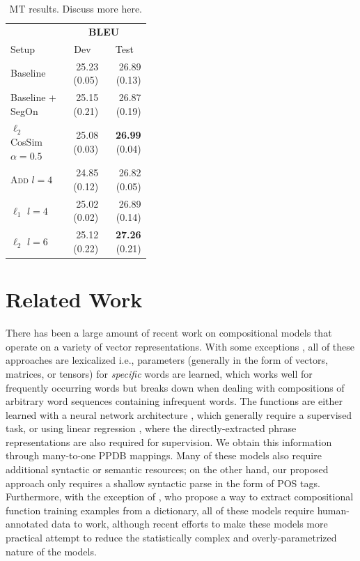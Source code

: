 \documentclass[11pt,letterpaper]{article}
\begin{document}
\begin{table}[h!]
  \begin{center}
    \begin{tabular}{p{0.4\linewidth}rr}
      \hline
	  & \multicolumn{2}{c}{\bf BLEU} \\
      Setup &  \multicolumn{1}{c}{Dev} & \multicolumn{1}{c}{Test} \\
	  \hline
	  Baseline & 25.23 (0.05) & 26.89 (0.13) \\
      Baseline + SegOn & 25.15 (0.21) & 26.87 (0.19) \\
	  $\ell_2$ CosSim $\alpha=0.5$ &  25.08 (0.03) & {\bf26.99} (0.04) \\
  	  \textsc{Add} $l=4$ &  24.85 (0.12) & 26.82 (0.05) \\
      $\ell_1$ $l=4$ &  25.02 (0.02) & 26.89 (0.14) \\
	  $\ell_2$  $l=6$ & 25.12 (0.22) & {\bf 27.26} (0.21) \\
	\end{tabular}
  \end{center}
  \caption{MT results. Discuss more here.}
  \label{tab:mt-results}
\end{table}

\section{Related Work}

There has been a large amount of recent work on compositional models that operate on a variety of vector representations. 
With some exceptions \cite{Mitchell2008,Mitchell2010}, all of these approaches are lexicalized i.e., parameters (generally in the form of vectors, matrices, or tensors) for \emph{specific} words are learned, which works well for frequently occurring words but breaks down when dealing with compositions of arbitrary word sequences containing infrequent words. 
The functions are either learned with a neural network architecture \cite[\emph{inter alia}]{Socher2013}, which generally require a supervised task, or using linear regression \cite{Baroni2010,Zanzotto2010}, where the directly-extracted phrase representations are also required for supervision.
We obtain this information through many-to-one PPDB mappings. 
Many of these models also require additional syntactic \cite{Socher2012} or semantic \cite{Hermann2013,Grefenstette2013} resources; on the other hand, our proposed approach only requires a shallow syntactic parse in the form of POS tags. 
Furthermore, with the exception of , who propose a way to extract compositional function training examples from a dictionary, all of these models require human-annotated data to work, although recent efforts to make these models more practical \cite{Paperno2014} attempt to reduce the statistically complex and overly-parametrized nature of the models.  
\end{document}
